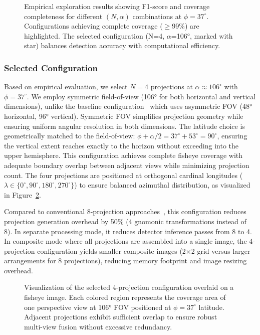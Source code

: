 \documentclass[twocolumn]{svjour3}          %
\begin{document}
\begin{figure}[!h]
	\centering
	\caption{Empirical exploration results showing F1-score and coverage completeness for different $(N, \alpha)$ combinations at $\phi=37^\circ$. Configurations achieving complete coverage ($\geq$99\%) are highlighted. The selected configuration (N=4, $\alpha$=106°, marked with star) balances detection accuracy with computational efficiency.}
	\label{fig:coverage_analysis}
\end{figure}

\subsubsection{Selected Configuration}

Based on empirical evaluation, we select $N=4$ projections at $\alpha \approx 106^\circ$ with $\phi = 37^\circ$. We employ symmetric field-of-view (106° for both horizontal and vertical dimensions), unlike the baseline configuration~\cite{chiang2021efficient} which uses asymmetric FOV (48° horizontal, 96° vertical). Symmetric FOV simplifies projection geometry while ensuring uniform angular resolution in both dimensions. The latitude choice is geometrically matched to the field-of-view: $\phi + \alpha/2 = 37^\circ + 53^\circ = 90^\circ$, ensuring the vertical extent reaches exactly to the horizon without exceeding into the upper hemisphere. This configuration achieves complete fisheye coverage with adequate boundary overlap between adjacent views while minimizing projection count. The four projections are positioned at orthogonal cardinal longitudes ($\lambda \in \{0^\circ, 90^\circ, 180^\circ, 270^\circ\}$) to ensure balanced azimuthal distribution, as visualized in Figure~\ref{fig:optimal_configuration}.

Compared to conventional 8-projection approaches~\cite{chiang2021efficient}, this configuration reduces projection generation overhead by 50\% (4 gnomonic transformations instead of 8). In separate processing mode, it reduces detector inference passes from 8 to 4. In composite mode where all projections are assembled into a single image, the 4-projection configuration yields smaller composite images (2×2 grid versus larger arrangements for 8 projections), reducing memory footprint and image resizing overhead. 

\begin{figure}[!h]
	\centering
	\caption{Visualization of the selected 4-projection configuration overlaid on a fisheye image. Each colored region represents the coverage area of one perspective view at 106° FOV positioned at $\phi=37^\circ$ latitude. Adjacent projections exhibit sufficient overlap to ensure robust multi-view fusion without excessive redundancy.}
	\label{fig:optimal_configuration}
\end{figure}
\end{document}

